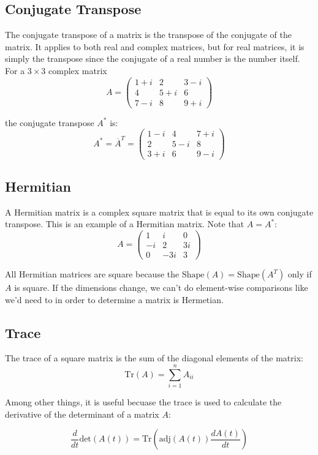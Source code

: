 \documentclass[12pt]{article}
\begin{document}
\subsection{Conjugate Transpose}
The conjugate transpose of a matrix is the transpose of the conjugate of the matrix. It applies to both real and complex matrices, but for real matrices, it is simply the transpose since the conjugate of a real number is the number itself.
For a \( 3 \times 3 \) complex matrix \[ A = \begin{pmatrix} 1+i & 2 & 3-i \\ 4 & 5+i & 6 \\ 7-i & 8 & 9+i \end{pmatrix} \] 

the conjugate transpose \( A^* \) is:
\[ A^* = \overline{A}^T = \begin{pmatrix} 1-i & 4 & 7+i \\ 2 & 5-i & 8 \\ 3+i & 6 & 9-i \end{pmatrix} \]

\subsection{Hermitian}
A Hermitian matrix is a complex square matrix that is equal to its own conjugate transpose. This is an example of  a Hermitian matrix. Note that \( A = A^* \):
\[ A = \begin{pmatrix} 1 & i & 0 \\ -i & 2 & 3i \\ 0 & -3i & 3 \end{pmatrix} \]

All Hermitian matrices are square because the \(\text{Shape}(A) = \text{Shape}(A^T)\) only if \(A\) is square. If the dimensions change, we can't do element-wise comparisons like we'd need to in order to determine a matrix is Hermetian. 

\subsection{Trace} 

The trace of a square matrix is the sum of the diagonal elements of the matrix:
\[\text{Tr}(A) = \sum_{i=1}^n A_{ii}\] 

Among other things, it is useful becuase the trace is used to calculate the derivative of the determinant of a matrix \(A\): 

\[\frac{d}{dt}\text{det}(A(t)) = \text{Tr}\left(\text{adj}(A(t)) \frac{dA(t)}{dt}\right)\] 
\end{document}
